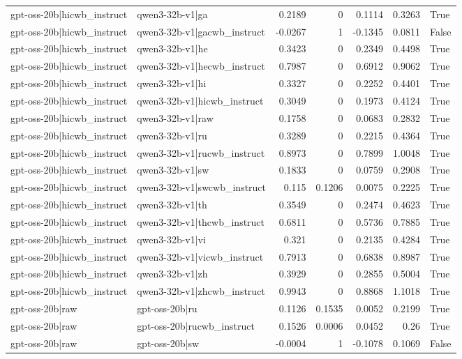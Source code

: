 \begin{table}
\begin{tabular}{l l r r r r l}
gpt-oss-20b|hicwb_instruct & qwen3-32b-v1|ga & 0.2189 & 0 & 0.1114 & 0.3263 & True \\
gpt-oss-20b|hicwb_instruct & qwen3-32b-v1|gacwb_instruct & -0.0267 & 1 & -0.1345 & 0.0811 & False \\
gpt-oss-20b|hicwb_instruct & qwen3-32b-v1|he & 0.3423 & 0 & 0.2349 & 0.4498 & True \\
gpt-oss-20b|hicwb_instruct & qwen3-32b-v1|hecwb_instruct & 0.7987 & 0 & 0.6912 & 0.9062 & True \\
gpt-oss-20b|hicwb_instruct & qwen3-32b-v1|hi & 0.3327 & 0 & 0.2252 & 0.4401 & True \\
gpt-oss-20b|hicwb_instruct & qwen3-32b-v1|hicwb_instruct & 0.3049 & 0 & 0.1973 & 0.4124 & True \\
gpt-oss-20b|hicwb_instruct & qwen3-32b-v1|raw & 0.1758 & 0 & 0.0683 & 0.2832 & True \\
gpt-oss-20b|hicwb_instruct & qwen3-32b-v1|ru & 0.3289 & 0 & 0.2215 & 0.4364 & True \\
gpt-oss-20b|hicwb_instruct & qwen3-32b-v1|rucwb_instruct & 0.8973 & 0 & 0.7899 & 1.0048 & True \\
gpt-oss-20b|hicwb_instruct & qwen3-32b-v1|sw & 0.1833 & 0 & 0.0759 & 0.2908 & True \\
gpt-oss-20b|hicwb_instruct & qwen3-32b-v1|swcwb_instruct & 0.115 & 0.1206 & 0.0075 & 0.2225 & True \\
gpt-oss-20b|hicwb_instruct & qwen3-32b-v1|th & 0.3549 & 0 & 0.2474 & 0.4623 & True \\
gpt-oss-20b|hicwb_instruct & qwen3-32b-v1|thcwb_instruct & 0.6811 & 0 & 0.5736 & 0.7885 & True \\
gpt-oss-20b|hicwb_instruct & qwen3-32b-v1|vi & 0.321 & 0 & 0.2135 & 0.4284 & True \\
gpt-oss-20b|hicwb_instruct & qwen3-32b-v1|vicwb_instruct & 0.7913 & 0 & 0.6838 & 0.8987 & True \\
gpt-oss-20b|hicwb_instruct & qwen3-32b-v1|zh & 0.3929 & 0 & 0.2855 & 0.5004 & True \\
gpt-oss-20b|hicwb_instruct & qwen3-32b-v1|zhcwb_instruct & 0.9943 & 0 & 0.8868 & 1.1018 & True \\
gpt-oss-20b|raw & gpt-oss-20b|ru & 0.1126 & 0.1535 & 0.0052 & 0.2199 & True \\
gpt-oss-20b|raw & gpt-oss-20b|rucwb_instruct & 0.1526 & 0.0006 & 0.0452 & 0.26 & True \\
gpt-oss-20b|raw & gpt-oss-20b|sw & -0.0004 & 1 & -0.1078 & 0.1069 & False \\

\end{tabular}
\end{table}
